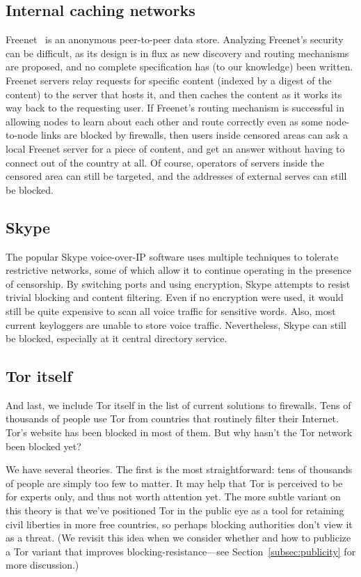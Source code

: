 \documentclass{llncs}
\begin{document}
\subsection{Internal caching networks}

Freenet~\cite{freenet-pets00} is an anonymous peer-to-peer data store.
Analyzing Freenet's security can be difficult, as its design is in flux as
new discovery and routing mechanisms are proposed, and no complete
specification has (to our knowledge) been written.  Freenet servers relay
requests for specific content (indexed by a digest of the content) to the
server that hosts it, and then caches the content as it works its way back to
the requesting user.  If Freenet's routing mechanism is successful in
allowing nodes to learn about each other and route correctly even as some
node-to-node links are blocked by firewalls, then users inside censored areas
can ask a local Freenet server for a piece of content, and get an answer
without having to connect out of the country at all.  Of course, operators of
servers inside the censored area can still be targeted, and the addresses of
external serves can still be blocked.

\subsection{Skype}

The popular Skype voice-over-IP software uses multiple techniques to tolerate
restrictive networks, some of which allow it to continue operating in the
presence of censorship.  By switching ports and using encryption, Skype
attempts to resist trivial blocking and content filtering.  Even if no
encryption were used, it would still be quite expensive to scan all voice
traffic for sensitive words.  Also, most current keyloggers are unable to
store voice traffic.  Nevertheless, Skype can still be blocked, especially at
it central directory service.

\subsection{Tor itself}

And last, we include Tor itself in the list of current solutions
to firewalls. Tens of thousands of people use Tor from countries that
routinely filter their Internet. Tor's website has been blocked in most
of them. But why hasn't the Tor network been blocked yet?

We have several theories. The first is the most straightforward: tens of
thousands of people are simply too few to matter. It may help that Tor is
perceived to be for experts only, and thus not worth attention yet. The
more subtle variant on this theory is that we've positioned Tor in the
public eye as a tool for retaining civil liberties in more free countries,
so perhaps blocking authorities don't view it as a threat. (We revisit
this idea when we consider whether and how to publicize a Tor variant
that improves blocking-resistance---see Section~\ref{subsec:publicity}
for more discussion.)
\end{document}
